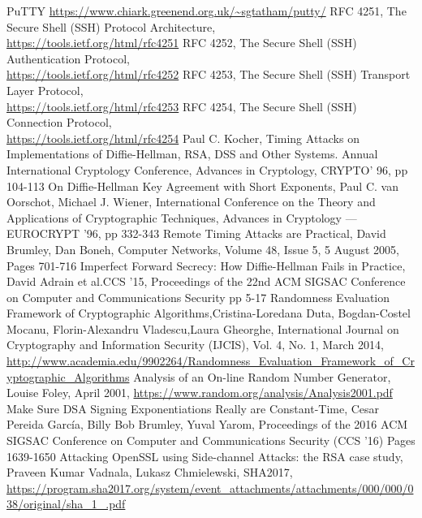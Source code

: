 \documentclass{bhamthesis}
\begin{document}
\begin{thebibliography}{9}
PuTTY
\url{https://www.chiark.greenend.org.uk/~sgtatham/putty/}
RFC 4251, The Secure Shell (SSH) Protocol Architecture,\\
\url{https://tools.ietf.org/html/rfc4251}
RFC 4252, The Secure Shell (SSH) Authentication Protocol,\\  \url{https://tools.ietf.org/html/rfc4252}
RFC 4253, The Secure Shell (SSH) Transport Layer Protocol,\\ \url{https://tools.ietf.org/html/rfc4253}
RFC 4254, The Secure Shell (SSH) Connection Protocol,\\ \url{https://tools.ietf.org/html/rfc4254}
Paul C. Kocher, Timing Attacks on Implementations of Diffie-Hellman, RSA, DSS  and Other Systems. Annual International Cryptology Conference, Advances in Cryptology, CRYPTO' 96, pp 104-113
On Diffie-Hellman Key Agreement with Short Exponents, Paul C. van Oorschot, Michael J. Wiener, International Conference on the Theory and Applications of Cryptographic Techniques, Advances in Cryptology — \\EUROCRYPT '96, pp 332-343
Remote Timing Attacks are Practical, David Brumley, Dan Boneh, Computer Networks, Volume 48, Issue 5, 5 August 2005, Pages 701-716
Imperfect Forward Secrecy: How Diffie-Hellman Fails in Practice, David Adrain et al.CCS '15, Proceedings of the 22nd ACM SIGSAC Conference on Computer and Communications Security
pp 5-17
Randomness Evaluation Framework of Cryptographic Algorithms,Cristina-Loredana Duta, Bogdan-Costel Mocanu, Florin-Alexandru Vladescu,Laura Gheorghe,  
International Journal on Cryptography and Information Security (IJCIS), Vol. 4, No. 1, March 2014, \url{http://www.academia.edu/9902264/Randomness_Evaluation_Framework_of_Cryptographic_Algorithms}
Analysis of an On-line Random Number Generator, Louise Foley, April 2001, \url{https://www.random.org/analysis/Analysis2001.pdf}
Make Sure DSA Signing Exponentiations Really are Constant-Time, Cesar Pereida García, Billy Bob Brumley, Yuval Yarom, Proceedings of the 2016 ACM SIGSAC Conference on Computer and Communications Security (CCS '16)
Pages 1639-1650
Attacking OpenSSL using Side-channel Attacks: the RSA case study, Praveen Kumar Vadnala, Lukasz Chmielewski, SHA2017,
\url{https://program.sha2017.org/system/event_attachments/attachments/000/000/038/original/sha_1_.pdf}
\end{thebibliography}
\listoffigures
\end{document}
